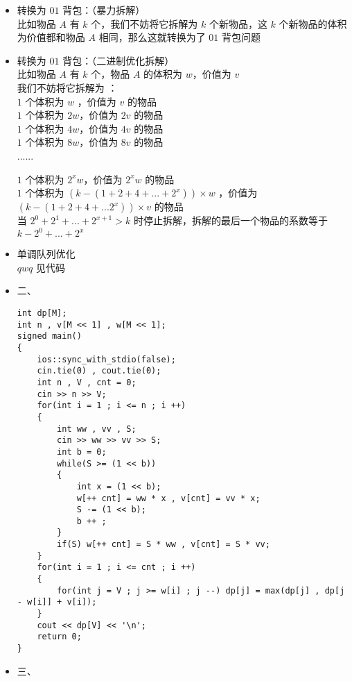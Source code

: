 \documentclass[E:/GsjzTle/main/main.tex]{subfiles}
\begin{document}
\begin{itemize}
\item
  转换为 \(01\) 背包：（暴力拆解）\\
  比如物品 \(A\) 有 \(k\) 个，我们不妨将它拆解为 \(k\) 个新物品，这
  \(k\) 个新物品的体积为价值都和物品 \(A\) 相同，那么这就转换为了 \(01\)
  背包问题
\item
  转换为 \(01\) 背包：（二进制优化拆解）\\
  比如物品 \(A\) 有 \(k\) 个，物品 \(A\) 的体积为 \(w\)，价值为 \(v\) \\
  我们不妨将它拆解为 ：\\
  \(1\) 个体积为 \(w\) ，价值为 \(v\) 的物品\\
  \(1\) 个体积为 \(2w\)，价值为 \(2v\) 的物品\\
  \(1\) 个体积为 \(4w\)，价值为 \(4v\) 的物品\\
  \(1\) 个体积为 \(8w\)，价值为 \(8v\) 的物品\\
  ......

  \(1\) 个体积为 \(2^xw\)，价值为 \(2^xw\) 的物品\\
  \(1\) 个体积为 \((k - (1 + 2 + 4 + ...+2^x)) \times w\) ，价值为
  \((k - (1+2+4+...2^x)) \times v\) 的物品\\
  当 \(2^0+2^1+...+2^{x+1}>k\) 时停止拆解，拆解的最后一个物品的系数等于
  \(k - 2^0+...+2^x\)
\item
  单调队列优化\\
  \(qwq\) 见代码
\item
  二、

\begin{lstlisting}
int dp[M];
int n , v[M << 1] , w[M << 1];
signed main()
{
	ios::sync_with_stdio(false);
	cin.tie(0) , cout.tie(0);
	int n , V , cnt = 0;
	cin >> n >> V;
	for(int i = 1 ; i <= n ; i ++)
	{
		int ww , vv , S;
		cin >> ww >> vv >> S;
		int b = 0;
		while(S >= (1 << b))
		{
			int x = (1 << b);
			w[++ cnt] = ww * x , v[cnt] = vv * x;
			S -= (1 << b);
			b ++ ;
		}
		if(S) w[++ cnt] = S * ww , v[cnt] = S * vv; 
	}
	for(int i = 1 ; i <= cnt ; i ++)
	{
		for(int j = V ; j >= w[i] ; j --) dp[j] = max(dp[j] , dp[j - w[i]] + v[i]);
	}
	cout << dp[V] << '\n';
	return 0;
}
\end{lstlisting}
\item
  三、
\end{itemize}
\end{document}
